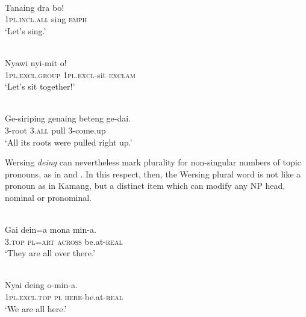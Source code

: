 \ea%
\label{ex:9:58}
 \\
\gll  Tanaing dra bo! \\
   \textsc{1pl.incl.all} sing   \textsc{emph}  \\
\glt `Let's sing.'
\z







\ea%
\label{ex:9:59}
 \\
\gll  Nyawi nyi-mit o! \\
   \textsc{1pl.excl.}\textsc{group} \textsc{1pl.excl}-sit \textsc{exclam}  \\
\glt `Let's sit together!'
\z







\ea%
\label{ex:9:60}
 \\
\gll  Ge-siriping genaing beteng ge-dai. \\
 \textsc{3-}root \textsc{3.all}   pull 3-come.up    \\
\glt `All its roots were pulled right up.'
\z





Wersing \textit{d}\textit{eing} can nevertheless mark plurality for non-singular numbers of topic pronouns, as in  and . In this respect, then, the Wersing plural word is not like a pronoun as in Kamang, but a distinct item which can modify any NP head, nominal or pronominal.


\ea%
\label{ex:9:61}
 \\
\gll  Gai dein=a mona min-a. \\
   \textsc{3.top} \textsc{pl}=\textsc{art} \textsc{across} be.at-\textsc{real}  \\
\glt `They are all over there.'
\z







\ea%
\label{ex:9:62}
 \\
\gll  Nyai deing o-min-a. \\
  \textsc{1pl.excl.top} \textsc{pl}   \textsc{here}-be.at-\textsc{real}   \\
\glt `We are all here.'
\z






